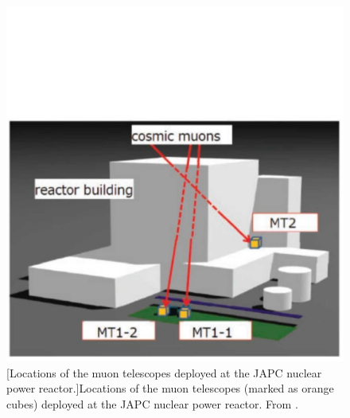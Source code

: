 \begin{figure}[!h]
\centering
\begin{minipage}{.45\textwidth}
  \centering
  \includegraphics[width=\linewidth]{Chapter5/Figs/MuTomographyExamples/JapcNuclearPowerImaging.jpg}
  [Locations of the muon telescopes deployed at the JAPC nuclear power reactor.]{Locations of the muon telescopes (marked as orange cubes) deployed at the JAPC nuclear power reactor. From \cite{Fujii_ReactorRadiography_2019}.} 
  \label{fig:JapcNuclearPowerImaging}
  \vspace{0.956cm} %
\end{minipage}%
\qquad
\begin{minipage}{.45\textwidth}
  \centering

\end{minipage}
\end{figure}
